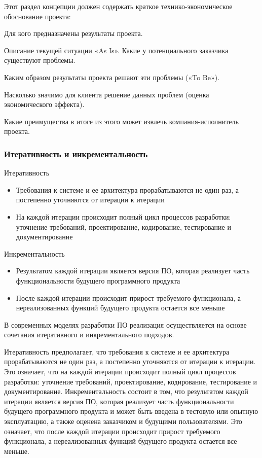 \documentclass{../industrial-development}
\begin{document}
Этот раздел концепции должен содержать краткое технико-экономическое обоснование проекта:

Для кого предназначены результаты проекта.

Описание текущей ситуации «As Is». Какие у потенциального заказчика существуют проблемы.

Каким образом результаты проекта решают эти проблемы («To Be»).

Насколько значимо для клиента решение данных проблем (оценка экономического эффекта).

Какие преимущества в итоге из этого может извлечь компания-исполнитель проекта.

    \begin{frame} \frametitle{Итеративность и инкрементальность}
	Итеративность
	\begin{itemize}
		\item Требования к системе и ее архитектура прорабатываются не один раз, а постепенно уточняются от итерации к итерации
		\item На каждой итерации происходит полный цикл процессов разработки: уточнение требований, проектирование, кодирование, тестирование и документирование
	\end{itemize}
	Инкрементальность
	\begin{itemize}
		\item Результатом каждой итерации является версия ПО, которая реализует часть функциональности будущего программного продукта
		\item После каждой итерации происходит прирост требуемого функционала, а нереализованных функций будущего продукта остается все меньше
	\end{itemize}
    \end{frame}
    \lecturenotes

В современных моделях разработки ПО реализация осуществляется на основе сочетания итеративного и инкрементального подходов.

Итеративность предполагает, что требования к системе и ее архитектура прорабатываются не один раз, а постепенно уточняются от итерации к итерации. Это означает, что на каждой итерации происходит полный цикл процессов разработки: уточнение требований, проектирование, кодирование, тестирование и документирование.
Инкрементальность состоит в том, что результатом каждой итерации является версия ПО, которая реализует часть функциональности будущего программного продукта и может быть введена в тестовую или опытную эксплуатацию, а также оценена заказчиком и будущими пользователями. Это означает, что после каждой итерации происходит прирост требуемого функционала, а нереализованных функций будущего продукта остается все меньше.
\end{document}

